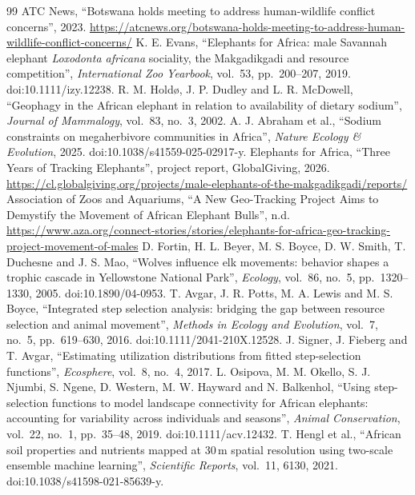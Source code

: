\documentclass[12pt,a4paper]{article}
\begin{document}
\newpage
\begin{thebibliography}{99}
 ATC News, ``Botswana holds meeting to address human-wildlife conflict concerns'', 2023. \url{https://atcnews.org/botswana-holds-meeting-to-address-human-wildlife-conflict-concerns/}
 K. E. Evans, ``Elephants for Africa: male Savannah elephant \emph{Loxodonta africana} sociality, the Makgadikgadi and resource competition'', \emph{International Zoo Yearbook}, vol.~53, pp.~200--207, 2019. doi:10.1111/izy.12238.
 R. M. Holdø, J. P. Dudley and L. R. McDowell, ``Geophagy in the African elephant in relation to availability of dietary sodium'', \emph{Journal of Mammalogy}, vol.~83, no.~3, 2002.
 A. J. Abraham et al., ``Sodium constraints on megaherbivore communities in Africa'', \emph{Nature Ecology \& Evolution}, 2025. doi:10.1038/s41559-025-02917-y.
 Elephants for Africa, ``Three Years of Tracking Elephants'', project report, GlobalGiving, 2026. \url{https://cl.globalgiving.org/projects/male-elephants-of-the-makgadikgadi/reports/}
 Association of Zoos and Aquariums, ``A New Geo-Tracking Project Aims to Demystify the Movement of African Elephant Bulls'', n.d. \url{https://www.aza.org/connect-stories/stories/elephants-for-africa-geo-tracking-project-movement-of-males}
 D. Fortin, H. L. Beyer, M. S. Boyce, D. W. Smith, T. Duchesne and J. S. Mao, ``Wolves influence elk movements: behavior shapes a trophic cascade in Yellowstone National Park'', \emph{Ecology}, vol.~86, no.~5, pp.~1320--1330, 2005. doi:10.1890/04-0953.
 T. Avgar, J. R. Potts, M. A. Lewis and M. S. Boyce, ``Integrated step selection analysis: bridging the gap between resource selection and animal movement'', \emph{Methods in Ecology and Evolution}, vol.~7, no.~5, pp.~619--630, 2016. doi:10.1111/2041-210X.12528.
 J. Signer, J. Fieberg and T. Avgar, ``Estimating utilization distributions from fitted step-selection functions'', \emph{Ecosphere}, vol.~8, no.~4, 2017.
 L. Osipova, M. M. Okello, S. J. Njumbi, S. Ngene, D. Western, M. W. Hayward and N. Balkenhol, ``Using step-selection functions to model landscape connectivity for African elephants: accounting for variability across individuals and seasons'', \emph{Animal Conservation}, vol.~22, no.~1, pp.~35--48, 2019. doi:10.1111/acv.12432.
 T. Hengl et al., ``African soil properties and nutrients mapped at 30\,m spatial resolution using two-scale ensemble machine learning'', \emph{Scientific Reports}, vol.~11, 6130, 2021. doi:10.1038/s41598-021-85639-y.
\end{thebibliography}
\end{document}
